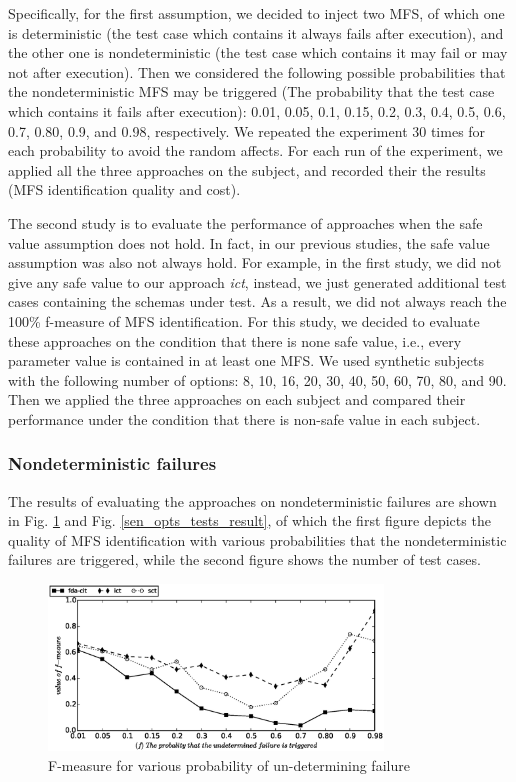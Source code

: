 \documentclass[10pt,journal,compsoc]{IEEEtran}
\begin{document}
Specifically, for the first assumption, we decided to inject two MFS, of which one is deterministic (the test case which contains it always fails after execution), and the other one is nondeterministic (the test case which contains it may fail or may not after execution). Then we considered the following possible probabilities that the nondeterministic MFS may be triggered (The probability that the test case which contains it fails after execution): 0.01, 0.05, 0.1, 0.15, 0.2, 0.3, 0.4, 0.5, 0.6, 0.7, 0.80, 0.9, and 0.98, respectively. We repeated the experiment 30 times for each probability to avoid the random affects. For each run of the experiment, we applied all the three approaches on the subject, and recorded their the results (MFS identification quality and cost).

The second study is to evaluate the performance of approaches when the safe value assumption does not hold. In fact, in our previous studies, the safe value assumption was also not always hold. For example, in the first study, we did not give any safe value to our approach \emph{ict}, instead, we just generated additional test cases containing the schemas under test. As a result, we did not always reach the 100\% f-measure of MFS identification. For this study, we decided to evaluate these approaches on the condition that there is none safe value, i.e., every parameter value is contained in at least one MFS. We used synthetic subjects with the following number of options: 8,  10, 16, 20, 30, 40, 50, 60, 70, 80, and 90. Then we applied the three approaches on each subject and compared their performance under the condition that there is non-safe value in each subject.

\subsubsection{Nondeterministic failures}
The results of evaluating the approaches on nondeterministic failures are shown in Fig. \ref{sen_und_f_measure_result} and Fig. \ref{sen_opts_tests_result}, of which the first figure depicts the quality of MFS identification with various probabilities that the nondeterministic failures are triggered, while the second figure shows the number of test cases.

\begin{figure}[htbp]
 \includegraphics[width=3.5in]{sen_und_f_measure.eps}
\caption{F-measure for various probability of un-determining failure}
\label{sen_und_f_measure_result}
\end{figure}
\end{document}
